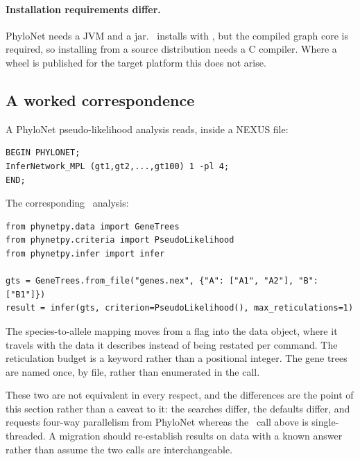 \paragraph{Installation requirements differ.}
PhyloNet needs a JVM and a jar. \phynetpy\ installs with , but the
compiled graph core is required, so installing from a source distribution needs
a C compiler. Where a wheel is published for the target platform this does not
arise.

\subsection{A worked correspondence}

A PhyloNet pseudo-likelihood analysis reads, inside a NEXUS file:

\begin{lstlisting}[language={}]
BEGIN PHYLONET;
InferNetwork_MPL (gt1,gt2,...,gt100) 1 -pl 4;
END;
\end{lstlisting}

The corresponding \phynetpy\ analysis:

\begin{lstlisting}
from phynetpy.data import GeneTrees
from phynetpy.criteria import PseudoLikelihood
from phynetpy.infer import infer

gts = GeneTrees.from_file("genes.nex", {"A": ["A1", "A2"], "B": ["B1"]})
result = infer(gts, criterion=PseudoLikelihood(), max_reticulations=1)
\end{lstlisting}

The species-to-allele mapping moves from a  flag into the data object,
where it travels with the data it describes instead of being restated per
command. The reticulation budget is a keyword rather than a positional integer.
The gene trees are named once, by file, rather than enumerated in the call.

These two are not equivalent in every respect, and the differences are the
point of this section rather than a caveat to it: the searches differ, the
defaults differ, and  requests four-way parallelism from PhyloNet
whereas the \phynetpy\ call above is single-threaded. A migration should
re-establish results on data with a known answer rather than assume the two
calls are interchangeable.
